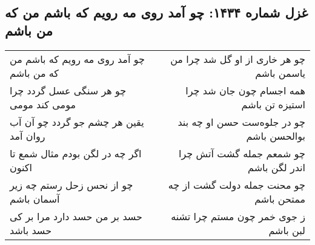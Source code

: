 \begin{center}
\section*{غزل شماره ۱۴۳۴: چو آمد روی مه رویم که باشم من که من باشم}
\label{sec:1434}
\begin{longtable}{l p{0.5cm} r}
چو آمد روی مه رویم که باشم من که من باشم
&&
چو هر خاری از او گل شد چرا من یاسمن باشم
\\
چو هر سنگی عسل گردد چرا مومی کند مومی
&&
همه اجسام چون جان شد چرا استیزه تن باشم
\\
یقین هر چشم جو گردد چو آن آب روان آمد
&&
چو در جلوه‌ست حسن او چه بند بوالحسن باشم
\\
اگر چه در لگن بودم مثال شمع تا اکنون
&&
چو شمعم جمله گشت آتش چرا اندر لگن باشم
\\
چو از نحس زحل رستم چه زیر آسمان باشم
&&
چو محنت جمله دولت گشت از چه ممتحن باشم
\\
حسد بر من حسد دارد مرا بر کی حسد باشد
&&
ز جوی خمر چون مستم چرا تشنه لبن باشم
\\
\end{longtable}
\end{center}
